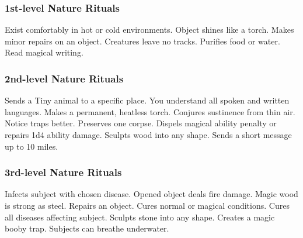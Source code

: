 \subsubsection{1st-level Nature Rituals}
\begin{rituallist}
     Exist comfortably in hot or cold environments.
     Object shines like a torch.
     Makes minor repairs on an object.
     Creatures leave no tracks.
     Purifies food or water.
     Read magical writing.
\end{rituallist}

\subsubsection{2nd-level Nature Rituals}
\begin{rituallist}
     Sends a Tiny animal to a specific place.
     You understand all spoken and written languages.
     Makes a permanent, heatless torch.
     Conjures sustinence from thin air.
     Notice traps better.
     Preserves one corpse.
     Dispels magical ability penalty or repairs 1d4 ability damage.
     Sculpts wood into any shape.
     Sends a short message up to 10 miles.
\end{rituallist}

\subsubsection{3rd-level Nature Rituals}
\begin{rituallist}
     Infects subject with chosen disease.
     Opened object deals fire damage.
     Magic wood is strong as steel.
     Repairs an object.
     Cures normal or magical conditions.
     Cures all diseases affecting subject.
     Sculpts stone into any shape.
     Creates a magic booby trap.
     Subjects can breathe underwater.
\end{rituallist}


